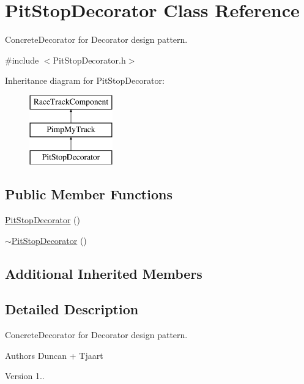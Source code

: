 \hypertarget{class_pit_stop_decorator}{}\section{Pit\+Stop\+Decorator Class Reference}
\label{class_pit_stop_decorator}


Concrete\+Decorator for Decorator design pattern.  




{\ttfamily \#include $<$Pit\+Stop\+Decorator.\+h$>$}

Inheritance diagram for Pit\+Stop\+Decorator\+:\begin{figure}[H]
\begin{center}
\leavevmode
\includegraphics[height=3.000000cm]{class_pit_stop_decorator}
\end{center}
\end{figure}
\subsection*{Public Member Functions}
\begin{DoxyCompactItemize}
\item 
\mbox{\hyperlink{class_pit_stop_decorator_afbae05423e77985887244313e751393d}{Pit\+Stop\+Decorator}} ()
\item 
\mbox{\hyperlink{class_pit_stop_decorator_a9921ee34d21b5a77072fd2465ae05b55}{$\sim$\+Pit\+Stop\+Decorator}} ()
\end{DoxyCompactItemize}
\subsection*{Additional Inherited Members}


\subsection{Detailed Description}
Concrete\+Decorator for Decorator design pattern. 

\begin{DoxyAuthor}{Authors}
Duncan + Tjaart 
\end{DoxyAuthor}
\begin{DoxyVersion}{Version}
1.. 
\end{DoxyVersion}


